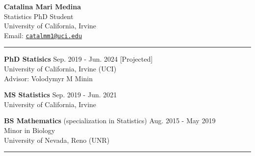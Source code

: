 \documentclass{article}
\makeatletter
\newcommand{\myname}{Catalina Mari Medina}
\newcommand{\myemail}{catalmm1@uci.edu}
\newcommand{\myhomeaddress}{Statistics PhD Student\\ %
	 University of California, Irvine \\ 
	 Email: \texttt{\href{mailto:\myemail}{\myemail}}
 }
\makeatother
\begin{document}
\thispagestyle{empty}
\phantom{.}\vspace{-2cm}
\begin{center}
	{\huge \bf \myname}\\
	\myhomeaddress
\end{center}

\vspace{-4mm}
\rule{\linewidth}{1pt}


\begin{description}
	\vspace{-2mm}
	\item[Education]\hspace*{.1in}
	
		\textbf{PhD Statisics} \hfill{Sep. 2019 - Jun. 2024 [Projected]} \\
		University of California, Irvine (UCI)\\ 
		Advisor: Volodymyr M Minin
		\vspace*{1mm}
		
		\textbf{MS Statistics} \hfill{Sep. 2019 - Jun. 2021}\\
		University of California, Irvine
		\vspace*{1mm}
		
		\textbf{BS Mathematics} (specialization in Statistics) \hfill{Aug. 2015 - May 2019} \\
		Minor in Biology\\
		University of Nevada, Reno (UNR)
		
\end{description}
\vspace{-2mm}
\rule{\linewidth}{1pt}
\end{document}
